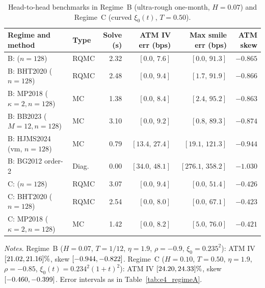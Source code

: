 \begin{table}[t]
\centering
\caption{Head-to-head benchmarks in Regime~B (ultra-rough one-month, $H=0.07$) and Regime~C (curved $\xi_0(t)$, $T=0.50$).}
\label{tab:e4_regimesBC}
\footnotesize
\begin{tabular}{@{}llrrrr@{}}
\toprule
Regime and method & Type & Solve (s) & ATM IV err (bps) & Max smile err (bps) & ATM skew \\
\midrule
B: \RCCE{} ($n=128$) & RQMC & 2.32 & $[0.0,\,7.6]$ & $[0.0,\,91.3]$ & $-0.865$ \\
B: BHT2020 ($n=128$) & RQMC & 2.48 & $[0.0,\,9.4]$ & $[1.7,\,91.9]$ & $-0.866$ \\
B: MP2018 ($\kappa=2,n=128$) & MC & 1.38 & $[0.0,\,8.4]$ & $[2.4,\,95.2]$ & $-0.863$ \\
B: BB2023 ($M=12,n=128$) & MC & 3.10 & $[0.0,\,9.2]$ & $[0.8,\,89.3]$ & $-0.874$ \\
B: HJMS2024 (vm, $n=128$) & MC & 0.79 & $[13.4,\,27.4]$ & $[19.1,\,121.3]$ & $-0.944$ \\
B: BG2012 order-2 & Diag. & 0.00 & $[34.0,\,48.1]$ & $[276.1,\,358.2]$ & $-1.030$ \\
\midrule
C: \RCCE{} ($n=128$) & RQMC & 3.07 & $[0.0,\,9.4]$ & $[0.0,\,51.4]$ & $-0.426$ \\
C: BHT2020 ($n=128$) & RQMC & 2.54 & $[0.0,\,8.0]$ & $[0.0,\,67.1]$ & $-0.423$ \\
C: MP2018 ($\kappa=2,n=128$) & MC & 1.42 & $[0.0,\,8.2]$ & $[5.0,\,76.0]$ & $-0.421$ \\
\bottomrule
\end{tabular}
\par\smallskip
\parbox{\linewidth}{\footnotesize\emph{Notes.} Regime~B ($H=0.07$, $T=1/12$, $\eta=1.9$, $\rho=-0.9$, $\xi_0=0.235^2$): \RCBridge{} ATM IV $[21.02,21.16]\%$, skew $[-0.944,-0.822]$. Regime~C ($H=0.10$, $T=0.50$, $\eta=1.9$, $\rho=-0.85$, $\xi_0(t)=0.234^2(1+t)^2$): ATM IV $[24.20,24.33]\%$, skew $[-0.460,-0.399]$. Error intervals as in Table~\ref{tab:e4_regimeA}.}
\end{table}
